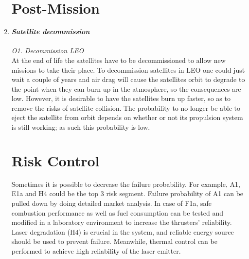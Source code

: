 \documentclass[11pt]{report}
\begin{document}
\begin{enumerate}[A]
\section{Post-Mission}
\label{blTRAPm}
	\item\textbf{\textit{Satellite decommission}} \\\\
\textit{O1. Decommission LEO}\\ 
At the end of life the satellites have to be decommissioned to allow new missions to take their place. To decommission satellites in \ac{LEO} one could just wait a couple of years and air drag will cause the satellites orbit to degrade to the point when they can burn up in the atmosphere, so the consequences are low. However, it is desirable to have the satellites burn up faster, so as to remove the risks of satellite collision. The probability to no longer be able to eject the satellite from orbit depends on whether or not its propulsion system is still working; as such this probability is low.

\section{Risk Control}
\label{blTRARC}
Sometimes it is possible to decrease the failure probability. For example, A1, E1a and H4 could be the top 3 risk segment. Failure probability of A1 can be pulled down by doing detailed market analysis. In case of F1a, safe combustion performance as well as fuel consumption can be tested and modified in a laboratory environment to increase the thrusters' reliability. Laser degradation (H4) is crucial in the system, and reliable energy source should be used to prevent failure. Meanwhile, thermal control can be performed to achieve high reliability of the laser emitter.  


\end{enumerate}
\end{document}
